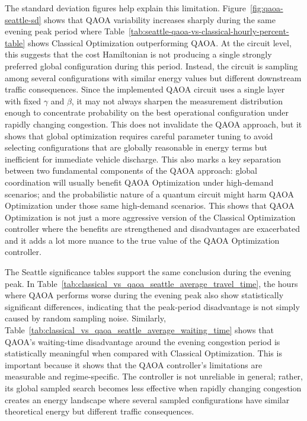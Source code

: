 \documentclass[12pt]{article}
\begin{document}
The standard deviation figures help explain this limitation. Figure~\ref{fig:qaoa-seattle-sd} shows that QAOA variability increases sharply during the same evening peak period where Table~\ref{tab:seattle-qaoa-vs-classical-hourly-percent-table} shows Classical Optimization outperforming QAOA. At the circuit level, this suggests that the cost Hamiltonian is not producing a single strongly preferred global configuration during this period. Instead, the circuit is sampling among several configurations with similar energy values but different downstream traffic consequences. Since the implemented QAOA circuit uses a single layer with fixed $\gamma$ and $\beta$, it may not always sharpen the measurement distribution enough to concentrate probability on the best operational configuration under rapidly changing congestion. This does not invalidate the QAOA approach, but it shows that global optimization requires careful parameter tuning to avoid selecting configurations that are globally reasonable in energy terms but inefficient for immediate vehicle discharge. This also marks a key separation between two fundamental components of the QAOA approach: global coordination will usually benefit QAOA Optimization under high-demand scenarios; and the probabilistic nature of a quantum circuit might harm QAOA Optimization under those same high-demand scenarios. This shows that QAOA Optimization is not just a more aggressive version of the Classical Optimization controller where the benefits are strengthened and disadvantages are exacerbated and it adds a lot more nuance to the true value of the QAOA Optimization controller.

The Seattle significance tables support the same conclusion during the evening peak. In Table~\ref{tab:classical_vs_qaoa_seattle_average_travel_time}, the hours where QAOA performs worse during the evening peak also show statistically significant differences, indicating that the peak-period disadvantage is not simply caused by random sampling noise. Similarly, Table~\ref{tab:classical_vs_qaoa_seattle_average_waiting_time} shows that QAOA's waiting-time disadvantage around the evening congestion period is statistically meaningful when compared with Classical Optimization. This is important because it shows that the QAOA controller's limitations are measurable and regime-specific. The controller is not unreliable in general; rather, its global sampled search becomes less effective when rapidly changing congestion creates an energy landscape where several sampled configurations have similar theoretical energy but different traffic consequences.
\end{document}
